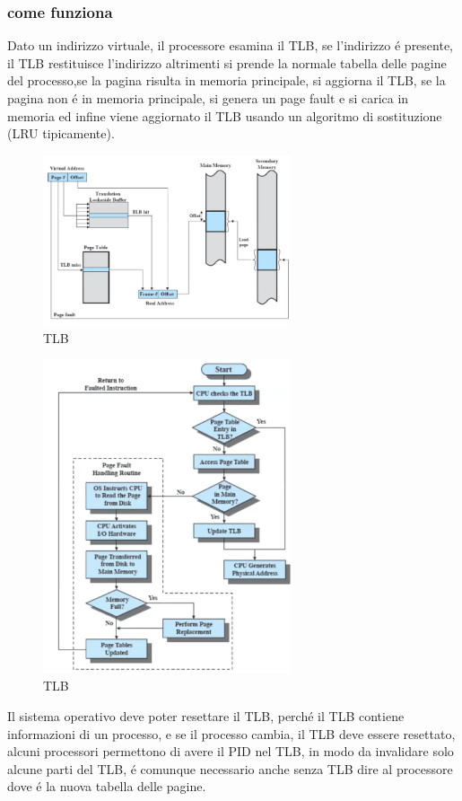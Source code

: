     \subsubsection*{come funziona}
    Dato un indirizzo virtuale, il processore esamina il TLB, se l'indirizzo é presente, il TLB restituisce l'indirizzo
    altrimenti si prende la normale tabella delle pagine del processo,se la pagina risulta in memoria principale, si
    aggiorna il TLB, se la pagina non é in memoria principale, si genera un page fault e si carica in memoria ed infine
    viene aggiornato il TLB usando un algoritmo di sostituzione (LRU tipicamente).
    \begin{figure}[H]
        \centering
        \includegraphics[width=0.65\textwidth]{immagini/HardwareTLB}
        \caption{TLB}
    \end{figure}
    \begin{figure}[H]
        \centering
        \includegraphics[width=0.65\textwidth]{immagini/FunzionamentoTLB}
        \caption{TLB}
    \end{figure}
    Il sistema operativo deve poter resettare il TLB, perché il TLB contiene informazioni di un processo, e se il processo
    cambia, il TLB deve essere resettato, alcuni processori permettono di avere il PID nel TLB, in modo da invalidare solo alcune
    parti del TLB, é comunque necessario anche senza TLB dire al processore dove é la nuova tabella delle pagine.

